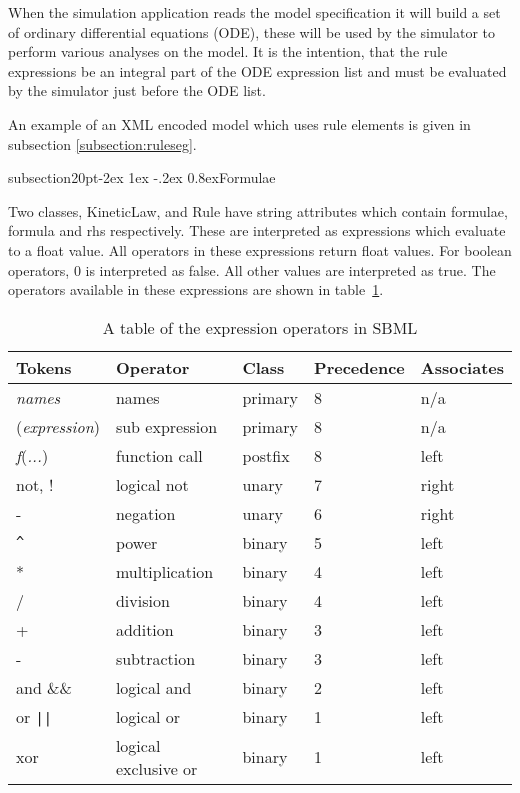 \documentclass[10pt]{article}
\makeatletter
\renewcommand{\subsection}{\@startsection%
  {subsection}{2}{0pt}{-2ex \@plus 1ex \@minus -.2ex}%
  {0.8ex}{\slshape\large\bfseries}}
\newcommand{\class}[1]{\textsf{#1}}
\newcommand{\attrib}[1]{\textsf{#1}}
\makeatother
\begin{document}
When the simulation application reads the model specification it
will build a set of ordinary differential equations (ODE), these
will be used by the simulator to perform various analyses on the
model. It is the intention, that the rule expressions be an
integral part of the ODE expression list and must be evaluated
by the simulator just before the ODE list.

An example of an XML encoded model which uses \class{rule} elements is given in
subsection \ref{subsection:ruleseg}.

\subsection{Formulae}

Two classes, \class{KineticLaw}, and \class{Rule} have string
attributes which contain formulae, \attrib{formula} and
\attrib{rhs} respectively.  These are interpreted as expressions which
evaluate to a float value. All operators in these expressions return float
values.  For boolean operators, 0 is interpreted as false.  All
other values are interpreted as true.  The operators available in
these expressions are shown in table~\ref{tab:operators}.

\begin{table}[h]
\begin{center}
\begin{tabular}{|l|l|l|l|l|}
\hline
 Tokens & Operator & Class & Precedence & Associates \\
\hline

\emph{names} & names & primary & 8 & n/a \\
(\emph{expression}) & sub expression & primary & 8 & n/a\\
\emph{f}(\emph{...}) & function call & postfix & 8 & left\\
not, ! & logical not & unary & 7 & right\\
- & negation & unary & 6 & right\\
\verb|^| & power & binary & 5 & left \\
* & multiplication & binary & 4 & left\\
/ & division & binary & 4 & left\\
+ & addition & binary & 3 & left\\
- & subtraction & binary & 3 & left\\
and \&\& & logical and & binary & 2 & left\\
or \verb+||+ & logical or & binary & 1 & left\\
xor & logical exclusive or & binary & 1 & left\\
\hline
\end{tabular}
\caption{A table of the expression operators in SBML}
\end{center}
\label{tab:operators}
\end{table}
\end{document}
